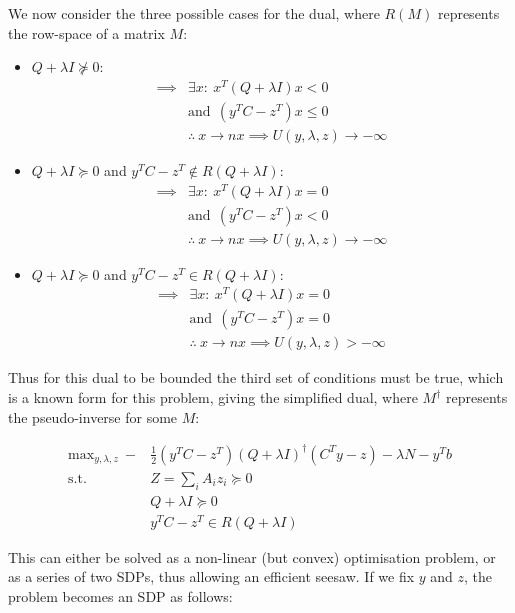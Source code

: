 \documentclass{article}
\begin{document}
We now consider the three possible cases for the dual, where $R(M)$ represents the row-space of a matrix $M$:

\begin{itemize}
\item $Q+\lambda I \not\succeq 0$:
	\begin{align}
		\implies &\exists x : ~ x^T (Q + \lambda I) x < 0 \\
				 &\text{and} ~~ (y^TC-z^T)x \le 0 \\
		&\therefore ~ x \to n x \implies U(y, \lambda, z) \to -\infty
	\end{align}
\item $Q+\lambda I \succeq 0$ and $y^TC-z^T \not \in R(Q+\lambda I)$:
	\begin{align}
		\implies &\exists x : ~ x^T (Q + \lambda I) x = 0 \\
				 &\text{and} ~~ (y^TC-z^T)x < 0 \\
		&\therefore ~ x \to n x \implies U(y, \lambda, z) \to -\infty
	\end{align}
\item $Q+\lambda I \succeq 0$ and $y^TC-z^T \in R(Q+\lambda I)$:
	\begin{align}
		\implies &\exists x : ~ x^T (Q + \lambda I) x = 0 \\
				 &\text{and} ~~ (y^TC-z^T)x = 0 \\
				 &\therefore ~ x \to n x \implies U(y, \lambda, z) > -\infty
	\end{align}
\end{itemize}

Thus for this dual to be bounded the third set of conditions must be true, which is a known form for this problem, giving the simplified dual, where $M^\dagger$ represents the pseudo-inverse for some $M$:

\begin{align}
	\text{max}_{y, \lambda, z} ~ -&\frac{1}{2} (y^T C - z^T) (Q+\lambda I)^\dagger (C^Ty - z) - \lambda N - y^T b \\ 
	\text{s.t.} ~~ &Z  = \sum_i A_i z_i \succeq 0 \\
				&Q+ \lambda I \succeq 0 \\
				&y^TC-z^T \in R(Q+\lambda I)
\end{align}

\pagebreak 

This can either be solved as a non-linear (but convex) optimisation problem, or as a series of two SDPs, thus allowing an efficient seesaw. If we fix $y$ and $z$, the problem becomes an SDP as follows:
\end{document}
